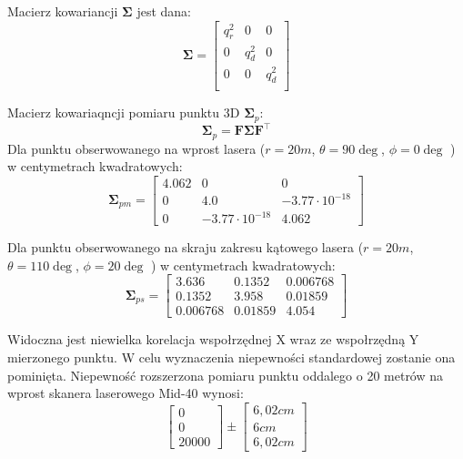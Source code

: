 \documentclass{article}
\begin{document}
Macierz kowariancji $\bm{\Sigma}$ jest dana:
\begin{equation}
\bm{\Sigma} =  \begin{bmatrix}
q_r^2 & 0 & 0 \\
0 & q_d^2 & 0 \\
0 & 0 & q_d^2 \\
\end{bmatrix}
\end{equation}




Macierz kowariaqncji pomiaru punktu 3D $\bm{\Sigma}_p$:
\begin{equation}
\bm{\Sigma}_p =  \bm{F} \bm{\Sigma} \bm{F}^\intercal
\end{equation}
Dla punktu obserwowanego na wprost lasera ($r=20m$, $\theta = 90 \deg$, $\phi = 0\deg$ ) w centymetrach kwadratowych:
\begin{equation}
\bm{\Sigma}_{pm} = 
\left[\begin{matrix}4.062 & 0 & 0\\0 & 4.0 & -3.77 \cdot 10^{-18}\\0 & -3.77 \cdot 10^{-18} & 4.062\end{matrix}\right]
\end{equation}

Dla punktu obserwowanego na skraju zakresu kątowego lasera ($r=20m$, $\theta = 110 \deg$, $\phi = 20 \deg$ ) w centymetrach kwadratowych:
\begin{equation}
\bm{\Sigma}_{ps} = 
\left[\begin{matrix}3.636 & 0.1352 & 0.006768\\0.1352 & 3.958 & 0.01859\\0.006768 & 0.01859 & 4.054\end{matrix}\right]
\end{equation}

Widoczna jest niewielka korelacja wspołrzędnej X wraz ze wspołrzędną Y mierzonego punktu. 
W celu wyznaczenia niepewności standardowej zostanie ona pominięta.
Niepewność rozszerzona pomiaru punktu oddalego o 20 metrów na wprost skanera laserowego Mid-40 wynosi:
\begin{equation}
\left[\begin{matrix}0 \\ 0 \\ 20000\end{matrix}\right] \pm \left[\begin{matrix} 6,02 cm \\ 6 cm \\ 6,02 cm\end{matrix}\right]
\end{equation}
\end{document}
